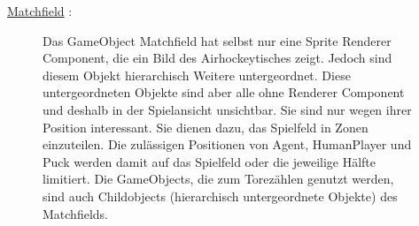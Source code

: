 \underline{Matchfield} :

\begin{figure} [h]

\begin{minipage}[t]{0.6\textwidth}
\vspace{0pt}
Das GameObject Matchfield hat selbst nur eine Sprite Renderer Component, die ein Bild des Airhockeytisches zeigt. Jedoch sind diesem Objekt hierarchisch Weitere untergeordnet. Diese untergeordneten Objekte sind aber alle ohne Renderer Component und deshalb in der Spielansicht unsichtbar. Sie sind nur wegen ihrer Position interessant. Sie dienen dazu, das Spielfeld in Zonen einzuteilen. Die zulässigen Positionen von Agent, HumanPlayer und Puck werden damit auf das Spielfeld oder die jeweilige Hälfte limitiert. Die GameObjects, die zum Torezählen genutzt werden, sind auch Childobjects (hierarchisch untergeordnete Objekte) des Matchfields.
\end{minipage}
\hspace{0.1\textwidth}
\begin{minipage}[t]{0.2\textwidth}
\vspace{0pt}

\end{minipage}
\end{figure}

